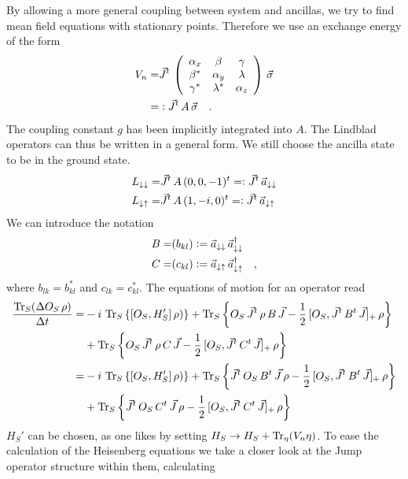 \documentclass{article}
\begin{document}
By allowing a more general coupling between system and ancillas, we try to find mean field equations with stationary points. Therefore we use an exchange energy of the form
\begin{align*}
    V_n =& \vec{J}^t\,\left(\begin{array}{ccc}
         \alpha_x&\beta&\gamma  \\
         \beta^*&\alpha_y&\lambda\\
         \gamma^*&\lambda^*&\alpha_z
    \end{array}\right)\,\vec{\sigma}\\
    =&\vcentcolon\vec{J}^t\,A\,\vec{\sigma}\quad.
\end{align*}
The coupling constant $g$ has been implicitly integrated into $A$. The Lindblad operators can thus be written in a general form. We still choose the ancilla state to be in the ground state.
\begin{align*}
    L_{\downarrow\downarrow}=&\vec{J}^t\,A\,(0,0,-1)^t=\vcentcolon\vec{J}^t\,\vec{a}_{\downarrow\downarrow}\\
    L_{\downarrow\uparrow}=&\vec{J}^t\,A\,(1,-i,0)^t=\vcentcolon\vec{J}^t\,\vec{a}_{\downarrow\uparrow}
\end{align*}
We can introduce the notation 
\begin{align*}
    B=&(b_{kl})\vcentcolon=\vec{a}_{\downarrow\downarrow}\,\vec{a}_{\downarrow\downarrow}^\dagger\\
    C=&(c_{kl})\vcentcolon=\vec{a}_{\downarrow\uparrow}\,\vec{a}_{\downarrow\uparrow}^\dagger\quad,
\end{align*}
where $b_{lk}=b_{kl}^*$ and $c_{lk}=c_{kl}^*$. The equations of motion for an operator read 
\begin{align*}
    \frac{\operatorname{Tr}_S(\Delta O_S\,\rho)}{\Delta t} =&
    -i\,\operatorname{Tr}_S\left\{[O_S,H_S']\,\rho)\right\}+\operatorname{Tr}_S\left\{O_S\,\vec{J}^t\,\rho\,B\,\vec{J}-\frac{1}{2}\,[O_S,\vec{J}^t\,B^t\,\vec{J}]_+\,\rho\right\}\\
    &+\operatorname{Tr}_S\left\{O_S\,\vec{J}^t\,\rho\,C\,\vec{J}-\frac{1}{2}\,[O_S,\vec{J}^t\,C^t\,\vec{J}]_+\,\rho\right\}\\
    =&
    -i\,\operatorname{Tr}_S\left\{[O_S,H_S']\,\rho)\right\}+\operatorname{Tr}_S\left\{\vec{J}^t\,O_S\,B^t\,\vec{J}\,\rho-\frac{1}{2}\,[O_S,\vec{J}^t\,B^t\,\vec{J}]_+\,\rho\right\}\\
    &+\operatorname{Tr}_S\left\{\vec{J}^t\,O_S\,C^t\,\vec{J}\,\rho-\frac{1}{2}\,[O_S,\vec{J}^t\,C^t\,\vec{J}]_+\,\rho\right\}
\end{align*}
$H_S'$ can be chosen, as one likes by setting $H_S\rightarrow H_S + \operatorname{Tr}_\eta(V_n\eta)$. To ease the calculation of the Heisenberg equations we take a closer look at the Jump operator structure within them, calculating
\end{document}
